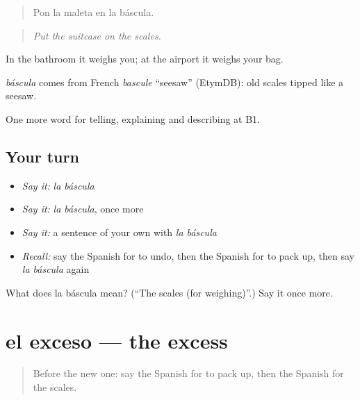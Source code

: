 \begin{quote}
Pon la maleta en la báscula.
\end{quote}

\begin{quote}
\emph{Put the suitcase on the scales.}
\end{quote}

In the bathroom it weighs you; at the airport it weighs your bag.

\begin{cousinweb}
\emph{báscula} comes from French \emph{bascule} \textquotedblleft{}seesaw\textquotedblright{} (EtymDB): old scales tipped like a seesaw.
\end{cousinweb}

\begin{grammarlens}[title={What you've built}]
One more word for telling, explaining and describing at B1.
\end{grammarlens}

\subsection*{Your turn}
\begin{itemize}
\raggedright
  \item \emph{Say it:} \emph{la báscula}
  \item \emph{Say it:} \emph{la báscula}, once more
  \item \emph{Say it:} a sentence of your own with \emph{la báscula}
  \item \emph{Recall:} say the Spanish for to undo, then the Spanish for to pack up, then say \emph{la báscula} again
\end{itemize}

\begin{tcolorbox}[breakable,colback=teal!4,colframe=teal!35!black,title={Before you move on}]
What does la báscula mean? (\textquotedblleft{}The scales (for weighing)\textquotedblright{}.) Say it once more.
\end{tcolorbox}
\section[el exceso]{el exceso — the excess}

\label{lesson:ES-C668-exceso}



\begin{quote}
Before the new one: say the Spanish for to pack up, then the Spanish for the scales.
\end{quote}

